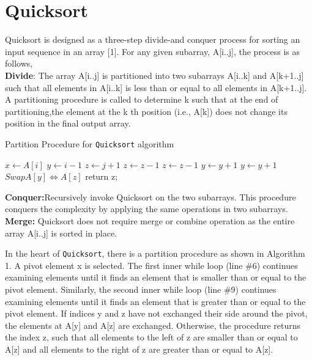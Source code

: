 \documentclass[a4paper, 10pt,twocolumn]{article}
\begin{document}
\section{Quicksort}
Quicksort is designed as a three-step divide-and conquer process for sorting an input sequence in an array [1]. For any given subarray, A[i..j], the process is as follows,
\\\textbf{Divide}: The array A[i..j] is partitioned into two subarrays A[i..k] and A[k+1..j] such that all elements in A[i..k] is less than or equal to all elements in A[k+1..j]. A partitioning procedure is called to determine k such that at the end of partitioning,the element at the k th position (i.e., A[k]) does not change its position in the final output array.
\begin{algorithm}
  \caption{Partition Procedure for \texttt{Quicksort} algorithm}
  \begin{algorithmic}[1]
     \newline
     \newline
     \State $x \leftarrow A[i]$
     \State $y \leftarrow i-1$
     \State $z \leftarrow j+1$
        \State $z \leftarrow z-1$
            \State $z \leftarrow z-1$
        \EndWhile
        \State $y \leftarrow y+1$
            \State $y \leftarrow y+1$
        \EndWhile
            \State $ Swap A[y] \Leftrightarrow A[z] $
        \Else
            \State return z;
        \EndIf

     \EndWhile
     \EndProcedure
  \end{algorithmic}
\end{algorithm}
\newline
\newline
\textbf{Conquer:}Recursively invoke Quicksort on the two subarrays. This procedure conquers the complexity by applying the same operations in two subarrays.
\\\textbf{Merge:} Quicksort does not require merge or combine operation as the entire array A[i..j] is sorted in place.

In the heart of \texttt{Quicksort}, there is a partition procedure as shown in Algorithm 1. A pivot element x is selected. The first inner while loop (line \#6) continues examining elements until it finds an element that is smaller than or equal to the pivot element. Similarly, the second inner while loop (line \#9) continues examining elements until it finds an element that is greater than or equal to the pivot element. If indices y and z have not exchanged their side around the pivot, the elements at A[y] and A[z] are exchanged. Otherwise, the procedure returns the index z, such that all elements to the left of z are smaller than or equal to A[z] and all elements to the right of z are greater than or equal to A[z].
\end{document}
